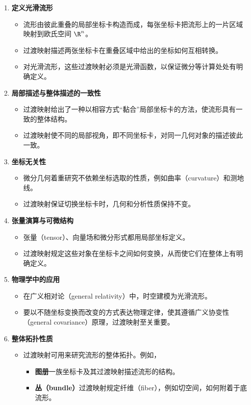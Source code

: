 \begin{enumerate}
  \item \textbf{定义光滑流形}
  \begin{itemize}
    \item 流形由彼此重叠的局部坐标卡构造而成，每张坐标卡把流形上的一片区域映射到欧氏空间 $\R^n$。
    \item 过渡映射描述两张坐标卡在重叠区域中给出的坐标如何互相转换。
    \item 对光滑流形，这些过渡映射必须是光滑函数，以保证微分等计算处处有明确定义。
  \end{itemize}
  \item \textbf{局部描述与整体描述的一致性}
  \begin{itemize}
    \item 过渡映射给出了一种以相容方式“黏合”局部坐标卡的方法，使流形具有一致的整体结构。
    \item 过渡映射使不同的局部视角，即不同坐标卡，对同一几何对象的描述彼此一致。
  \end{itemize}
  \item \textbf{坐标无关性}
  \begin{itemize}
    \item 微分几何着重研究不依赖坐标选取的性质，例如曲率（curvature）和测地线。
    \item 过渡映射保证切换坐标卡时，几何和分析性质保持不变。
  \end{itemize}
  \item \textbf{张量演算与可微结构}
  \begin{itemize}
    \item 张量（tensor）、向量场和微分形式都用局部坐标定义。
    \item 过渡映射规定这些对象在坐标卡之间如何变换，从而使它们在整体上有明确定义。
  \end{itemize}
  \item \textbf{物理学中的应用}
  \begin{itemize}
    \item 在广义相对论（general relativity）中，时空建模为光滑流形。
    \item 要以不随坐标变换而改变的方式表达物理定律，使其遵循广义协变性（general covariance）原理，过渡映射至关重要。
  \end{itemize}
  \item \textbf{整体拓扑性质}
  \begin{itemize}
    \item 过渡映射可用来研究流形的整体拓扑。例如，
    \begin{itemize}
      \item \textbf{图册}\quad 一族坐标卡及其过渡映射描述流形的结构。
      \item \textbf{丛（bundle）}\quad 过渡映射规定纤维（fiber），例如切空间，如何附着于底流形。
    \end{itemize}
  \end{itemize}
\end{enumerate}

